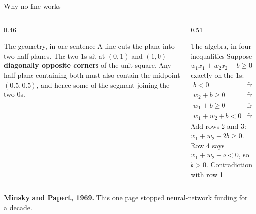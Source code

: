 \documentclass[aspectratio=169]{beamer}
\begin{document}
\begin{frame}[shrink=6]{Why no line works}
  \begin{columns}[T]
    \begin{column}{0.46\textwidth}
      \begin{block}{The geometry, in one sentence}
        A line cuts the plane into two half-planes. The two $1$s sit at
        $(0,1)$ and $(1,0)$ --- \textbf{diagonally opposite corners} of the
        unit square. Any half-plane containing both must also contain the
        midpoint $(0.5, 0.5)$, and hence some of the segment joining the two
        $0$s.
      \end{block}
    \end{column}
    \begin{column}{0.51\textwidth}
      \begin{block}{The algebra, in four inequalities}
        Suppose $w_1x_1 + w_2x_2 + b \ge 0$ exactly on the $1$s:
        \[
          \begin{array}{ll}
            b < 0 & \text{from } (0,0) \to 0\\
            w_2 + b \ge 0 & \text{from } (0,1) \to 1\\
            w_1 + b \ge 0 & \text{from } (1,0) \to 1\\
            w_1 + w_2 + b < 0 & \text{from } (1,1) \to 0
          \end{array}
        \]
        Add rows 2 and 3: $w_1 + w_2 + 2b \ge 0$. Row 4 says
        $w_1 + w_2 + b < 0$, so $b > 0$. Contradiction with row 1.
      \end{block}
    \end{column}
  \end{columns}
  \begin{center}\small
    \textbf{Minsky and Papert, 1969.} This one page stopped neural-network
    funding for a decade.
  \end{center}
\end{frame}
\end{document}
